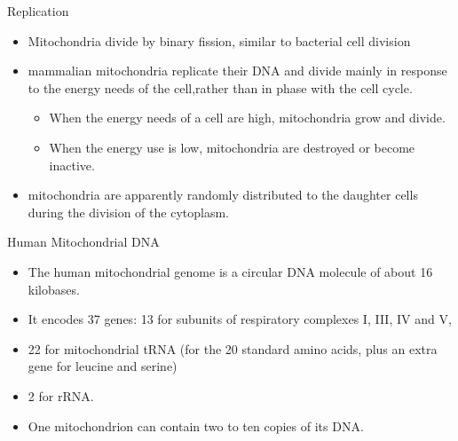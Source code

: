 \documentclass[presentation, smaller]{beamer}
\begin{document}
\begin{frame}[label={sec:orgdee1a30}]{Replication}
\begin{itemize}
\item Mitochondria divide by binary fission, similar to bacterial cell division

\item mammalian mitochondria replicate their DNA and divide mainly in response
to the energy needs of the cell,rather than in phase with the cell cycle.
\begin{itemize}
\item When the energy needs of a cell are high, mitochondria grow and
divide.
\item When the energy use is low, mitochondria are destroyed
or become inactive.
\end{itemize}

\item mitochondria are apparently randomly distributed to the daughter
cells during the division of the cytoplasm.
\end{itemize}
\end{frame}


\begin{frame}[label={sec:org5c66d09}]{Human Mitochondrial DNA}
\begin{itemize}
\item The human mitochondrial genome is a circular DNA molecule of about
16 kilobases.
\item It encodes 37 genes: 13 for subunits of respiratory complexes I,
III, IV and V,
\item 22 for mitochondrial tRNA (for the 20 standard amino acids, plus an
extra gene for leucine and serine)
\item 2 for rRNA.
\item One mitochondrion can contain two to ten copies of its DNA.
\end{itemize}
\end{frame}
\end{document}
